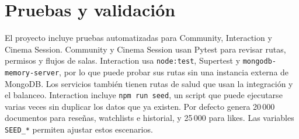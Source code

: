 ﻿\chapter{Pruebas y validación}
El proyecto incluye pruebas automatizadas para Community, Interaction y Cinema Session. Community y Cinema Session usan Pytest para revisar rutas, permisos y flujos de salas. Interaction usa \texttt{node:test}, Supertest y \texttt{mongodb-memory-server}, por lo que puede probar sus rutas sin una instancia externa de MongoDB. Los servicios también  tienen rutas de salud que usan la integración y el balanceo.
Interaction incluye \texttt{npm run seed}, un script que puede ejecutarse varias veces sin duplicar los datos que ya existen. Por defecto genera 20\,000 documentos para reseñas, watchlists e historial, y 25\,000 para likes. Las variables \texttt{SEED\_*} permiten ajustar estos escenarios.
